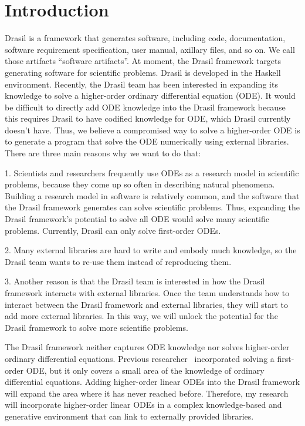 \chapter{Introduction}
Drasil is a framework that generates software, including code, documentation, software requirement specification, user manual, axillary files, and so on. We call those artifacts ``software artifacts''. At moment, the Drasil framework targets generating software for scientific problems. Drasil is developed in the Haskell environment. Recently, the Drasil team has been interested in expanding its knowledge to solve a higher-order ordinary differential equation (ODE). It would be difficult to directly add ODE knowledge into the Drasil framework because this requires Drasil to have codified knowledge for ODE, which Drasil currently doesn't have. Thus, we believe a compromised way to solve a higher-order ODE is to generate a program that solve the ODE numerically using external libraries. There are three main reasons why we want to do that:

1. Scientists and researchers frequently use ODEs as a research model in scientific problems, because they come up so often in describing natural phenomena. Building a research model in software is relatively common, and the software that the Drasil framework generates can solve scientific problems. Thus, expanding the Drasil framework's potential to solve all ODE would solve many scientific problems. Currently, Drasil can only solve first-order ODEs.

2. Many external libraries are hard to write and embody much knowledge, so the Drasil team wants to re-use them instead of reproducing them.

3. Another reason is that the Drasil team is interested in how the Drasil framework interacts with external libraries. Once the team understands how to interact between the Drasil framework and external libraries, they will start to add more external libraries. In this way, we will unlock the potential for the Drasil framework to solve more scientific problems. 

The Drasil framework neither captures ODE knowledge nor solves higher-order ordinary differential equations. Previous researcher~\citep{brooks} incorporated solving a first-order ODE, but it only covers a small area of the knowledge of ordinary differential equations. Adding higher-order linear ODEs into the Drasil framework will expand the area where it has never reached before. Therefore, my research will incorporate higher-order linear ODEs in a complex knowledge-based and generative environment that can link to externally provided libraries.

